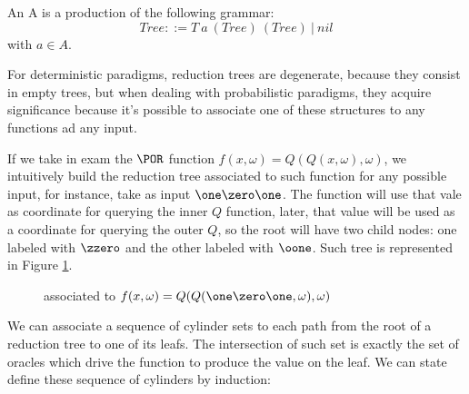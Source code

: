 \begin{conditional}{\notappendix}
  \begin{defn}
    An \rt A is a production of the following grammar:
    \[
    \mathit{Tree}::= \mathit T\ a\ (\mathit{Tree})\ (\mathit{Tree})\ |\ \mathit{nil}
    \]
    with $a \in A$.
  \end{defn}

  For deterministic paradigms, reduction trees are degenerate, because
  they consist in empty trees, but when dealing with probabilistic paradigms, they
  acquire significance because it's possible to associate one of these structures
  to any functions ad any input.

  \begin{example}
    If we take in exam the
    $\POR$ function $f(x, \omega) = Q(Q(x, \omega), \omega)$,
    we intuitively build the reduction tree associated to such function for any
    possible input, for instance, take as input $\one\zero\one$.
    The function will use that vale as coordinate for querying the inner $Q$
    function, later, that value will be used as a coordinate for querying the
    outer $Q$, so the root will have two child nodes: one labeled with $\zzero$
    and the other labeled with $\oone$. Such tree
    is represented in Figure \ref{fig:samplert}.
  \end{example}

  \begin{figure}[]
    \caption{\rt {\Ss} associated to $f(x, \omega) = Q(Q(\one\zero\one, \omega), \omega)$}
    \label{fig:samplert}
  \end{figure}

  We can associate a sequence of cylinder sets to each path from the root
  of a reduction tree to one of its leafs. The intersection of such set is exactly
  the set of oracles which drive the function to produce the value on the leaf.
  We can state define these sequence of cylinders by induction:


\end{conditional}
